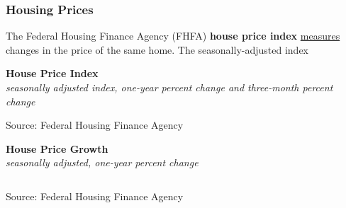 \documentclass{report}
\makeatletter
\newcommand{\tbllink}[1]{\href{https://raw.githubusercontent.com/bdecon/US-chartbook/master/chartbook/data/#1}{\faTable}}
\newcommand*\short[1]{\expandafter\@gobbletwo\number\numexpr#1\relax}
\newcommand{\dateaxisticks}{
		date coordinates in=x, axis line style={draw=none},
		xmax={2024-01-31},
		max space between ticks=40,	    
		xtick={{1990-01-01}, {1992-01-01}, {1994-01-01}, 
			{1996-01-01}, {1998-01-01}, {2000-01-01}, 
			{2002-01-01}, {2004-01-01}, {2006-01-01},
			{2008-01-01}, {2010-01-01}, {2012-01-01}, {2014-01-01},
		    {2016-01-01}, {2018-01-01}, {2020-01-01}, {2022-01-01}, 
		    {2024-01-01}, {2026-01-01}},
		minor xtick={{1989-01-01}, {1991-01-01}, {1993-01-01},
			{1995-01-01}, {1997-01-01}, {1999-01-01}, 
			{2001-01-01}, {2003-01-01}, {2005-01-01}, {2007-01-01},
		    {2009-01-01}, {2011-01-01}, {2013-01-01}, {2015-01-01},
		    {2017-01-01}, {2019-01-01}, {2021-01-01}, {2023-01-01}, 
		    {2025-01-01}, {2027-01-01}},
		enlarge y limits={0.06}, enlarge x limits={0.01},
		xticklabel style={align=center, yshift=-2pt}, tick label style={inner sep=0pt},
		}
\newcommand{\bbar}[2]{extra #1 ticks = {{#2}}, extra #1 tick labels = ,
		extra #1 tick style = {grid=major, grid style={thick, black!25}},}
\newcommand{\stdline}[4]{\addplot[very thick, no markers, color=#1] 
		table [x=#2, y=#3, col sep=comma] {#4};	}
\newcommand{\thickline}[4]{\addplot[ultra thick, no markers, color=#1] 
		table [x=#2, y=#3, col sep=comma] {#4};	}
\newcommand{\rebars}{
		\fill[color=black!10] (axis cs:{2007-12-01},\pgfkeysvalueof{/pgfplots/ymin}) 
			rectangle (axis cs:{2009-07-01}, \pgfkeysvalueof{/pgfplots/ymax});
		\fill[color=black!10] (axis cs:{2001-03-01},\pgfkeysvalueof{/pgfplots/ymin}) 
			rectangle (axis cs:{2001-11-01}, \pgfkeysvalueof{/pgfplots/ymax});
		\fill[color=black!10] (axis cs:{2020-02-01},\pgfkeysvalueof{/pgfplots/ymin}) 
			rectangle (axis cs:{2020-05-01}, \pgfkeysvalueof{/pgfplots/ymax});}
\makeatother
\begin{document}
{\subsubsection*{Housing Prices}   
\begin{minipage}{1.0\textwidth}
\small The Federal Housing Finance Agency (FHFA) \textbf{house price index} \href{https://www.fhfa.gov/DataTools/Downloads/Pages/House-Price-Index-Datasets.aspx}{measures} changes in the price of the same home. The seasonally-adjusted index 

\normalsize \textbf{House Price Index}\\
\footnotesize{\textit{seasonally adjusted index, one-year percent change and three-month percent change}}
\vspace{3.4cm}

\hspace{3mm} 

\footnotesize{Source: Federal Housing Finance Agency} \hfill \tbllink{hpi.csv}
\vspace{1mm}

\normalsize{\textbf{House Price Growth}}\\
\footnotesize{\textit{seasonally adjusted, one-year percent change}}\\
\hspace*{-3mm} \noindent {} \setlength{\tabcolsep}{3.6pt} \color{black!90}
		{\renewcommand{\arraystretch}{1.45}
		 \begin{tabular}{p{24mm} R{7mm} R{7mm} R{7mm} R{7mm} R{7mm} R{7mm} R{7mm} R{11.0mm} R{10.2mm}}
			  \hline
		\end{tabular}}
		
	\vspace{-2mm}
\footnotesize{Source: Federal Housing Finance Agency} \hfill \tbllink{hpi.csv}
\end{minipage}
\vspace{3mm}

}
\end{document}

